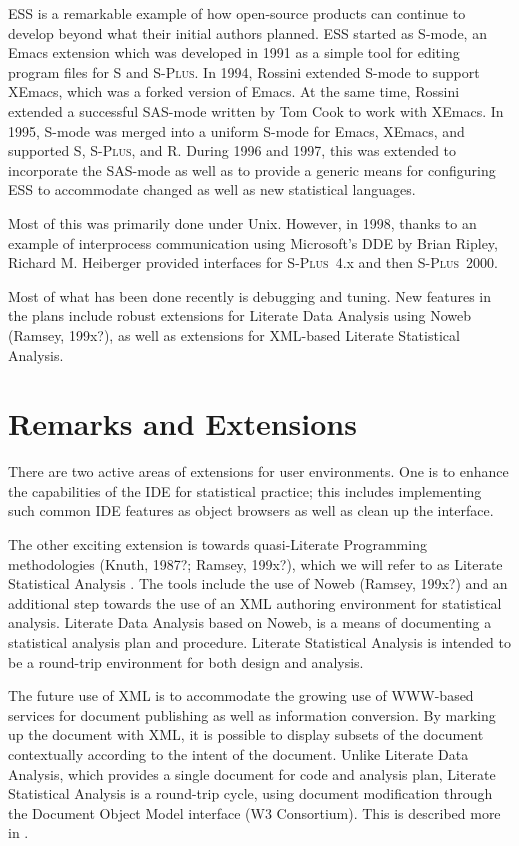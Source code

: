 \documentclass{article}
\newcommand*{\Splus}{\textsc{S-Plus}}
\begin{document}
ESS is a remarkable example of how open-source products can continue
to develop beyond what their initial authors planned.  ESS started as
S-mode, an Emacs extension which was developed in 1991 as a simple
tool for editing program files for S and \Splus.  In 1994, Rossini
extended S-mode to support XEmacs, which was a forked version of
Emacs.  At the same time, Rossini extended a successful SAS-mode
written by Tom Cook to work with XEmacs.  In 1995, S-mode was merged
into a uniform S-mode for Emacs, XEmacs, and supported S, \Splus, and
R. During 1996 and 1997, this was extended to incorporate the
SAS-mode as well as to provide a generic means for configuring ESS to
accommodate changed as well as new statistical languages.

Most of this was primarily done under Unix.  However, in 1998, thanks
to an example of interprocess communication using Microsoft's DDE by
Brian Ripley, Richard M. Heiberger provided interfaces for \Splus~4.x
and then \Splus~2000.

Most of what has been done recently is debugging and tuning.  New
features in the plans include robust extensions for Literate Data
Analysis using Noweb (Ramsey, 199x?), as well as extensions for
XML-based Literate Statistical Analysis.

\section{Remarks and Extensions}
\label{sec:remarks}

There are two active areas of extensions for user environments.  One
is to enhance the capabilities of the IDE for statistical practice;
this includes implementing such common IDE features as object browsers
as well as clean up the interface.

The other exciting extension is towards quasi-Literate Programming
methodologies (Knuth, 1987?; Ramsey, 199x?), which we will refer to as
Literate Statistical Analysis \citep{ross:lunt:2001}. The tools include
the use of Noweb (Ramsey, 199x?) and an additional step towards the
use of an XML authoring environment for statistical analysis.
Literate Data Analysis based on Noweb, is a means of documenting a
statistical analysis plan and procedure.  Literate Statistical
Analysis is intended to be a round-trip environment for both design
and analysis.

The future use of XML is to accommodate the growing use of WWW-based
services for document publishing as well as information conversion.
By marking up the document with XML, it is possible to display subsets
of the document contextually according to the intent of the document.
Unlike Literate Data Analysis, which provides a single document for
code and analysis plan, Literate Statistical Analysis is a round-trip
cycle, using document modification through the Document Object Model
interface (W3 Consortium).  This is described more in
\citep{ross:lunt:2001}. 



\end{document}
